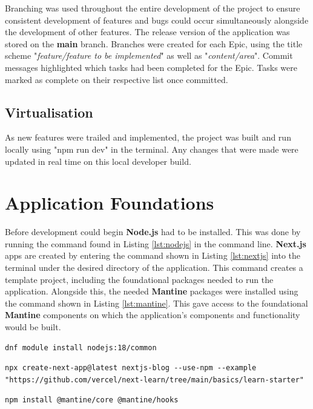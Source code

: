 \documentclass{l4proj}
\begin{document}
Branching was used throughout the entire development of the project to ensure consistent development of features and bugs could occur simultaneously alongside the development of other features. The release version of the application was stored on the \textbf{main} branch. Branches were created for each Epic, using the title scheme "\textit{feature/feature to be implemented}" as well as "\textit{content/area}". Commit messages highlighted which tasks had been completed for the Epic. Tasks were marked as complete on their respective list once committed.

\subsection{Virtualisation}
As new features were trailed and implemented,  the project was built and run locally using "npm run dev" in the terminal. Any changes that were made were updated in real time on this local developer build.

\section{Application Foundations}
Before development could begin \textbf{Node.js} had to be installed. This was done by running the command found in Listing \ref{lst:nodejs} in the command line. \textbf{Next.js} apps are created by entering the command shown in Listing \ref{lst:nextjs} into the terminal under the desired directory of the application. This command creates a template project, including the foundational packages needed to run the application. Alongside this,  the needed \textbf{Mantine} packages were installed using the command shown in Listing \ref{lst:mantine}. This gave access to the foundational \textbf{Mantine} components on which the application's components and functionality would be built.
\begin{lstlisting}[float,  caption={The command to install Node.js.},  label={lst:nodejs}]
    dnf module install nodejs:18/common
\end{lstlisting}
\begin{lstlisting}[float,  caption={The command to create a Next.js application.},  label={lst:nextjs}]
    npx create-next-app@latest nextjs-blog --use-npm --example "https://github.com/vercel/next-learn/tree/main/basics/learn-starter"
\end{lstlisting}
\begin{lstlisting}[float,  caption={The command to install the needed Mantine packages.},  label={lst:mantine}]
    npm install @mantine/core @mantine/hooks
\end{lstlisting}
\end{document}
